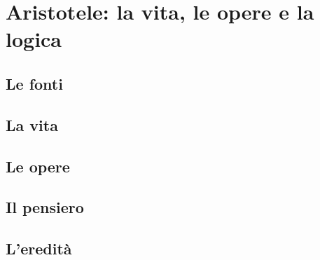 \chapter{Aristotele: la vita, le opere e la logica}

\section{Le fonti}

\section{La vita}

\section{Le opere}

\section{Il pensiero}

\section{L'eredità}
